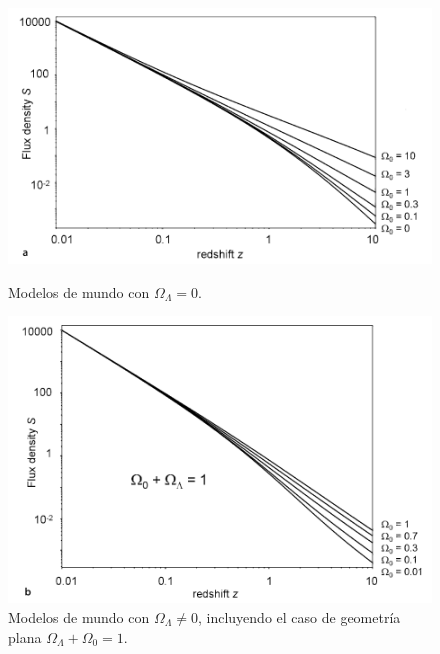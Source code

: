\documentclass[11pt]{article}
\begin{document}
{\begin{itemize}
\end{itemize}

\begin{figure}[H]
        \begin{minipage}[b]{0.41\linewidth}
            \includegraphics[scale=0.40]{79a_Malcolmpp237.png}
            \caption{\footnotesize{Modelos de mundo con $\Omega_{\Lambda}=0$.}}
    \end{minipage}
        \hspace{0.9cm}
    \begin{minipage}[b]{0.36\linewidth}
            \includegraphics[scale=0.39]{79b_Malcolmpp237.png}
            
            \caption{\footnotesize{Modelos de mundo con $\Omega_{\Lambda} \neq 0$, incluyendo el caso de geometría plana $\Omega_{\Lambda} + \Omega_0 =1$. }}
    \end{minipage}
\end{figure}

}
\end{document}
